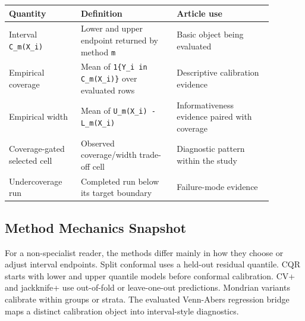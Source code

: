 \documentclass[11pt]{article}
\begin{document}
\begingroup
\footnotesize
\setlength{\tabcolsep}{2pt}
\renewcommand{\arraystretch}{1.18}
\begin{tabular}{@{}>{\RaggedRight\arraybackslash}p{0.240\linewidth}>{\RaggedRight\arraybackslash}p{0.320\linewidth}>{\RaggedRight\arraybackslash}p{0.320\linewidth}@{}}
\toprule
Quantity & Definition & Article use \\
\midrule
Interval \texttt{C\_\allowbreak{}m(X\_\allowbreak{}i)} & Lower and upper endpoint returned by method \texttt{m} & Basic object being evaluated \\
Empirical coverage & Mean of \texttt{1\{Y\_\allowbreak{}i in C\_\allowbreak{}m(X\_\allowbreak{}i)\}} over evaluated rows & Descriptive calibration evidence \\
Empirical width & Mean of \texttt{U\_\allowbreak{}m(X\_\allowbreak{}i) -\allowbreak{} L\_\allowbreak{}m(X\_\allowbreak{}i)} & Informativeness evidence paired with coverage \\
Coverage-gated selected cell & Observed coverage/width trade-off cell & Diagnostic pattern within the study \\
Undercoverage run & Completed run below its target boundary & Failure-mode evidence \\
\bottomrule
\end{tabular}
\endgroup

\subsection{Method Mechanics Snapshot}

For a non-specialist reader, the methods differ mainly in how they choose or adjust interval endpoints. Split conformal uses a held-out residual quantile. CQR starts with lower and upper quantile models before conformal calibration. CV+ and jackknife+ use out-of-fold or leave-one-out predictions. Mondrian variants calibrate within groups or strata. The evaluated Venn-Abers regression bridge maps a distinct calibration object into interval-style diagnostics.
\end{document}
